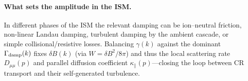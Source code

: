 \paragraph{What sets the amplitude in the ISM.}
In different phases of the ISM the relevant damping can be ion–neutral friction, non-linear Landau damping, turbulent damping by the ambient cascade, or simple collisional/resistive losses.
Balancing $\gamma(k)$ against the dominant $\Gamma_{\rm damp}(k)$ fixes $\delta B(k)$ (via $W=\delta B^2/8\pi$) and thus the local scattering rate $D_{\mu\mu}(p)$ and parallel diffusion coefficient $\kappa_\parallel(p)$—closing the loop between CR transport and their self-generated turbulence.


